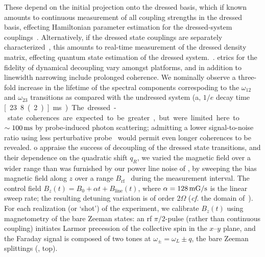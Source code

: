 \documentclass[aps,prl,reprint,superscriptaddress,floatfix]{revtex4-1}
\begin{document}
These depend on the initial projection onto the dressed basis, which if known amounts to continuous measurement of all coupling strengths in the dressed basis, effecting Hamiltonian parameter estimation for the dressed-system couplings~.
Alternatively, if the dressed state couplings are separately characterized~\cite{lundblad_synthetic_2017}, this amounts to  real-time measurement of the dressed density matrix, effecting quantum state estimation of the dressed system.~.
etrics for the fidelity of dynamical decoupling vary amongst platforms, and in addition to linewidth narrowing include prolonged coherence.
We nominally observe a three-fold increase in the lifetime of the spectral components correspoding to the $\omega_{12}$ and $\omega_{23}$ transitions as compared with the undressed system (a, $1/e$ decay time \unit[23.8(2)]{ms}).
The dressed-state coherences are expected to be greater, but were limited here to $\sim\unit[100]{ms}$ by probe-induced photon scattering; admitting a lower signal-to-noise ratio using less perturbative probe~\cite{jasperse_magic-wavelength_2017} would permit even longer coherences to be revealed.
o appraise the success of decoupling of the dressed state transitions, and their dependence on the quadratic shift $q_R$, 
we varied the magnetic field over a wider range than was furnished by our power line noise of , by sweeping the bias magnetic field along $z$ over a range $B_{\text{rf}}$~ during the measurement interval.
The control field $B_z(t) = B_0 + \alpha t + B_{\text{line}}(t)$, where $\alpha = \unit[128]{mG/s}$ is the linear sweep rate; the resulting detuning variation is of order $2\Omega$ (\textit{cf.} the domain of~).
For each realization (or `shot') of the experiment, we calibrate $B_z(t)$ using magnetometry of the bare Zeeman states: an rf $\pi/2$-pulse (rather than continuous coupling) initiates Larmor precession of the collective spin in the $x$--$y$ plane, and the Faraday signal is composed of two tones at $\omega_\pm = \omega_L \pm q$, the bare Zeeman splittings (, top).
\end{document}
